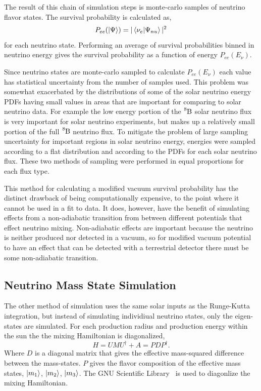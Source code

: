 The result of this chain of simulation steps is monte-carlo samples
of neutrino flavor states. The survival probability is calculated as,
\begin{equation}
P_{ee}(\ket{\Psi}) = |\braket{\nu_{e}}{\Psi_{nu}}|^2
\end{equation}
for each neutrino state.
Performing an average of survival probabilities binned in neutrino energy 
gives the survival probability as a function of energy $P_{ee}(E_{\nu})$.

Since neutrino states are monte-carlo sampled to calculate $P_{ee}(E_{\nu})$
each value has statistical uncertainty from the number of samples used.
This problem was somewhat exacerbated by the distributions of some of the
solar neutrino energy PDFs having small values in areas that are important for
comparing to solar neutrino data. For example the low energy portion of the
$\ce{^{8}B}$ solar neutrino flux is very important for solar neutrino experiments,
but makes up a relatively small portion of the full $\ce{^{8}B}$ neutrino flux.
To mitigate the problem of large sampling uncertainty for important regions in
solar neutrino energy, energies were sampled according to a flat distribution
and according to the PDFs for each solar neutrino flux. These two methods of sampling
were performed in equal proportions for each flux type.

This method for calculating a modified vacuum survival probability has the
distinct drawback of being computationally expensive, to the point
where it cannot be used in a fit to data.
It does, however, have the benefit of simulating effects from a non-adiabatic
transition from between different potentials that effect neutrino mixing.
Non-adiabatic effects are important because the neutrino is neither produced nor
detected in a vacuum, so for modified vacuum potential to have an effect
that can be detected with a terrestrial detector there must be some
non-adiabatic transition.

\subsection{Neutrino Mass State Simulation} %
The other method of simulation uses the same solar inputs as the
Runge-Kutta integration, but instead of simulating individiual neutrino
states, only the eigen-states are simulated.
For each production radius and production energy within the sun the
the mixing Hamiltonian is diagonalized,
\begin{equation}
    H = U M U^{\dagger} + A = P D P^{\dagger}\text{.}
\end{equation}
Where $D$ is a diagonal matrix that gives the effective mass-squared
difference between the mass-states.
$P$ gives the flavor composition of the effective mass states,
$\ket{m_{1}}$, $\ket{m_{2}}$, $\ket{m_{3}}$.
The GNU Scientific Library~\citep{gsl_ref} is used to diagonlize
the mixing Hamiltonian.

